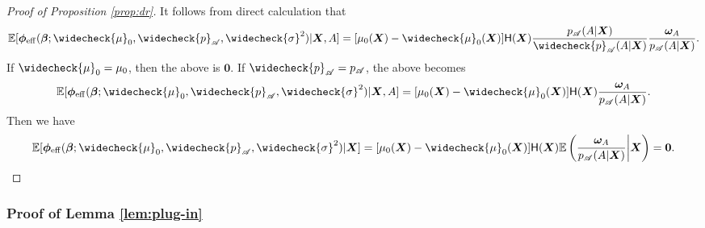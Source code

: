 \documentclass[11pt]{article}
\numberwithin{equation}{section}
\theoremstyle{definition}
\theoremstyle{remark}
\newcommand{\bX}{\bm{X}}
\newcommand{\bbeta}{\bm{\beta}}
\newcommand{\bomega}{\bm{\omega}}
\newcommand{\bphi}{\bm{\phi}}
\newcommand{\bbE}{\mathbb{E}}
\newcommand{\sA}{\mathscr{A}}
\newcommand{\sfH}{\mathsf{H}}
\newcommand{\bzero}{\mathbf{0}}	%
\newcommand{\eff}{\mathrm{eff}}
\begin{document}
\begin{proof}[Proof of Proposition \ref{prop:dr}]
	It follows from direct calculation that
	\[ \bbE[\bphi_{\eff}(\bbeta;\widecheck{\mu}_{0},\widecheck{p}_{\sA},\widecheck{\sigma}^{2})|\bX,A] = [\mu_{0}(\bX) - \widecheck{\mu}_{0}(\bX)]\sfH(\bX){p_{\sA}(A|\bX) \over \widecheck{p}_{\sA}(A|\bX)}{\bomega_{A} \over p_{\sA}(A|\bX)}. \]
	If $ \widecheck{\mu}_{0} = \mu_{0} $, then the above is $ \bzero $. If $ \widecheck{p}_{\sA} = p_{\sA} $, the above becomes 
	\[ \bbE[\bphi_{\eff}(\bbeta;\widecheck{\mu}_{0},\widecheck{p}_{\sA},\widecheck{\sigma}^{2})|\bX,A] = [\mu_{0}(\bX) - \widecheck{\mu}_{0}(\bX)]\sfH(\bX){\bomega_{A} \over p_{\sA}(A|\bX)}. \]
	Then we have
	\[ \bbE[\bphi_{\eff}(\bbeta;\widecheck{\mu}_{0},\widecheck{p}_{\sA},\widecheck{\sigma}^{2})|\bX] = [\mu_{0}(\bX) - \widecheck{\mu}_{0}(\bX)]\sfH(\bX)\bbE\left(  {\bomega_{A} \over p_{\sA}(A|\bX)} \middle|\bX \right) = \bzero. \]
\end{proof}

\subsubsection{Proof of Lemma \ref{lem:plug-in}}\label{sec:lem_plug-in}
\end{document}
